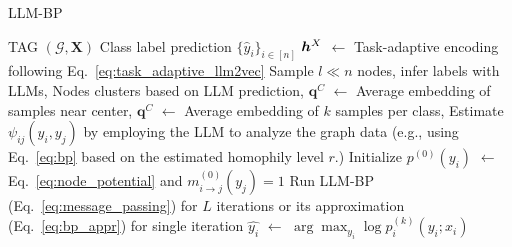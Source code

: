 \begin{algorithm}[t]
\caption{LLM-BP}
\label{alg:llm_bp}
\begin{algorithmic}[1]
\INPUT TAG $(\mathcal{G}, \boldsymbol{X})$
\OUTPUT Class label prediction $\{\hat{y}_i\}_{i\in[n]}$
\STATE $\boldsymbol{h}^{X}$ $\leftarrow$ Task-adaptive encoding following Eq.~\eqref{eq:task_adaptive_llm2vec}
\STATE Sample $l \ll n$ nodes, infer labels with LLMs,
\STATE Nodes clusters based on LLM prediction,
\STATE $\mathbf{q}^{C}$ $\gets$ Average embedding of samples near center,
\STATE $\mathbf{q}^{C}$ $\gets$ Average embedding of $k$ samples per class,
\ENDIF
\STATE Estimate $\psi_{ij}(y_i, y_j)$ by employing the LLM to analyze the graph data (e.g., using Eq.~\eqref{eq:bp} based on the estimated homophily level $r$.)
\STATE Initialize $p^{(0)}(y_i)$ $\gets$ Eq.~\eqref{eq:node_potential} and $m^{(0)}_{i \to j} (y_j) = 1$
\STATE Run LLM-BP (Eq.~\eqref{eq:message_passing}) for $L$ iterations or its approximation (Eq.~\eqref{eq:bp_appr}) for single iteration
\STATE $\hat{y_i}$ $\gets$ $\arg \max_{y_i} \log p_i^{(k)}(y_i;x_i)$

\end{algorithmic}
\end{algorithm}